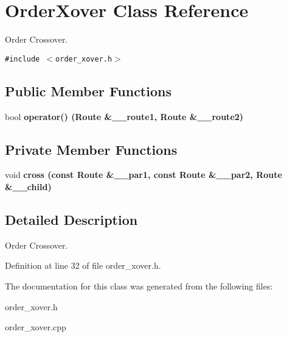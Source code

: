\section{Order\-Xover Class Reference}
\label{class_order_xover}
Order Crossover.  


{\tt \#include $<$order\_\-xover.h$>$}

\subsection*{Public Member Functions}
\begin{CompactItemize}
\item 
bool \bf{operator()} (Route \&\_\-\_\-route1, Route \&\_\-\_\-route2)\label{class_order_xover_0ff6aada669eb8173322ed68cda1ac61}

\end{CompactItemize}
\subsection*{Private Member Functions}
\begin{CompactItemize}
\item 
void \bf{cross} (const Route \&\_\-\_\-par1, const Route \&\_\-\_\-par2, Route \&\_\-\_\-child)\label{class_order_xover_d2bf90b5f46ac4a344777e17bc5f364d}

\end{CompactItemize}


\subsection{Detailed Description}
Order Crossover. 



Definition at line 32 of file order\_\-xover.h.

The documentation for this class was generated from the following files:\begin{CompactItemize}
\item 
order\_\-xover.h\item 
order\_\-xover.cpp\end{CompactItemize}
